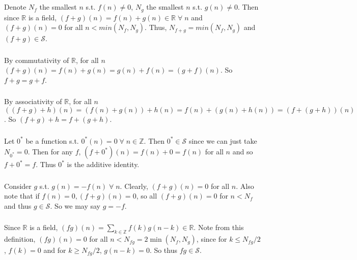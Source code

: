 \documentclass{article}
\begin{document}
\section{}
\subsection{}
\subsubsection{}
Denote $N_f$ the smallest $n$ s.t. $f(n) \neq 0$, $N_g$ the smallest $n$ s.t. $g(n) \neq 0$. Then since $\mathbb{R}$ is a field, $(f+g)(n) = f(n) + g(n) \in \mathbb{R} \; \forall \; n$ and $(f+g)(n) = 0$ for all $n<min(N_f,N_g)$. Thus, $N_{f+g} = min(N_f,N_g) $ and $(f+g) \in \mathcal{S}$.
\subsubsection{}
By commutativity of $\mathbb{R}$, for all $n$ $(f+g)(n) = f(n) + g(n) = g(n) + f(n) = (g+f)(n)$. So $f+g = g+f$.
\subsubsection{}
By associativity of $\mathbb{R}$, for all $n$ $((f+g)+h)(n) = (f(n) + g(n)) + h(n) = f(n) + (g(n) + h(n)) = (f+(g+h))(n)$. So $(f+g) + h = f + (g+h)$.
\subsubsection{}
Let $0^*$ be a function s.t. $0^*(n) = 0 \; \forall \; n \in \mathbb{Z}$. Then $0^* \in \mathcal{S}$ since we can just take $N_{0^*} = 0$. Then for any $f$, $(f+0^*)(n) = f(n) + 0 = f(n)$ for all $n$ and so $f+0^* = f$. Thus $0^*$ is the additive identity.
\subsubsection{}
Consider $g$ s.t. $g(n) = -f(n) \; \forall \; n$. Clearly, $(f+g)(n) = 0$ for all $n$. Also note that if $f(n) = 0, (f+g)(n) = 0$, so all $(f+g)(n) = 0$ for $n<N_f$ and thus $g \in \mathcal{S}$. So we may say $g = -f$.
\subsubsection{}
Since $\mathbb{R}$ is a field, $(fg)(n) = \sum\limits_{k \in \mathbb{Z}} f(k)g(n-k) \in \mathbb{R}$. Note from this definition, $(fg)(n) = 0$ for all $n<N_{fg} = 2\min(N_f,N_g)$, since for $k\leq N_{fg}/2$, $f(k) = 0$ and for $k \geq N_{fg}/2$, $g(n-k) = 0$. So thus $fg \in \mathcal{S}$.
\end{document}
